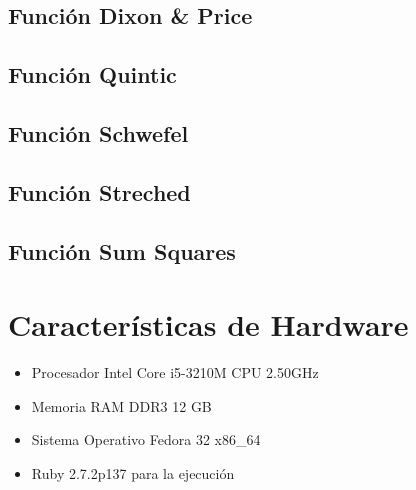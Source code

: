 \documentclass[10pt]{article}
\begin{document}
\subsection{Función Dixon \& Price}
\begin{center}
  
\end{center}

\subsection{Función Quintic}
\begin{center}
  
\end{center}

\subsection{Función Schwefel}
\begin{center}
  
\end{center}

\subsection{Función Streched}
\begin{center}
  
\end{center}

\subsection{Función Sum Squares}
\begin{center}
  
\end{center}
\section{Características de Hardware}
\begin{itemize}
  \item Procesador Intel Core i5-3210M CPU 2.50GHz
  \item Memoria RAM DDR3 12 GB
  \item Sistema Operativo Fedora 32 x86\_64
  \item Ruby 2.7.2p137 para la ejecución
\end{itemize}
\end{document}
